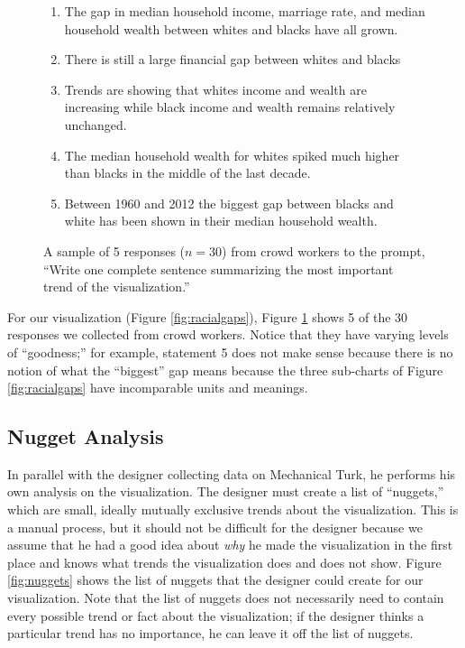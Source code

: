 \documentclass{sigchi}
\begin{document}
\begin{figure}[t]
  \begin{framed}
  \begin{center}
  \begin{enumerate}
    \item The gap in median household income, marriage rate, and
    median household wealth between whites and blacks have all grown.
    \item There is still a large financial gap between whites and blacks
    \item Trends are showing that whites income and wealth are increasing while black income and wealth remains relatively unchanged.
    \item The median household wealth for whites spiked much higher than blacks in the middle of the last decade.
    \item Between 1960 and 2012 the biggest gap between blacks and white has been shown in their median household wealth.
  \end{enumerate}
  \end{center}
  \end{framed}
  \caption{A sample of 5 responses ($n=30$) from crowd workers to the prompt, ``Write one complete sentence summarizing the most important trend of the visualization.''}
  \label{fig:sample}
\end{figure}

For our visualization (Figure \ref{fig:racialgaps}), Figure
\ref{fig:sample} shows 5 of the 30 responses we collected from crowd
workers. Notice that they have varying levels of ``goodness;'' for
example, statement 5 does not make sense because there is no notion of
what the ``biggest'' gap means because the three sub-charts of Figure
\ref{fig:racialgaps} have incomparable units and meanings.

\subsection{Nugget Analysis}

In parallel with the designer collecting data on Mechanical Turk, he
performs his own analysis on the visualization. The designer must
create a list of ``nuggets,'' which are small, ideally mutually
exclusive trends about the visualization. This is a manual process,
but it should not be difficult for the designer because we assume that
he had a good idea about \textit{why} he made the visualization in the
first place and knows what trends the visualization does and does not
show. Figure \ref{fig:nuggets} shows the list of nuggets that the
designer could create for our visualization. Note that the list of
nuggets does not necessarily need to contain every possible trend or
fact about the visualization; if the designer thinks a particular
trend has no importance, he can leave it off the list of nuggets.
\end{document}
